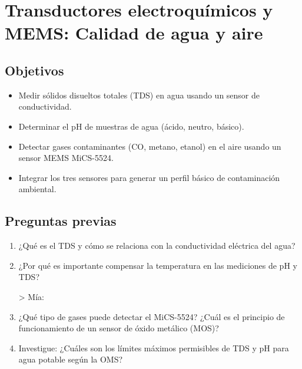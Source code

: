 \chapter{Transductores electroquímicos y MEMS: Calidad de agua y aire}

\section*{Objetivos}
\begin{itemize}
    \item Medir sólidos disueltos totales (TDS) en agua usando un sensor de conductividad.
    \item Determinar el pH de muestras de agua (ácido, neutro, básico).
    \item Detectar gases contaminantes (CO, metano, etanol) en el aire usando un sensor MEMS MiCS-5524.
    \item Integrar los tres sensores para generar un perfil básico de contaminación ambiental.
\end{itemize}

\section*{Preguntas previas}
\begin{enumerate}
    \item ¿Qué es el TDS y cómo se relaciona con la conductividad eléctrica del agua?
    \item ¿Por qué es importante compensar la temperatura en las mediciones de pH y TDS?

> Mía:
\item ¿Qué tipo de gases puede detectar el MiCS-5524? ¿Cuál es el principio de funcionamiento de un sensor de óxido metálico (MOS)?
    \item Investigue: ¿Cuáles son los límites máximos permisibles de TDS y pH para agua potable según la OMS?
\end{enumerate}

